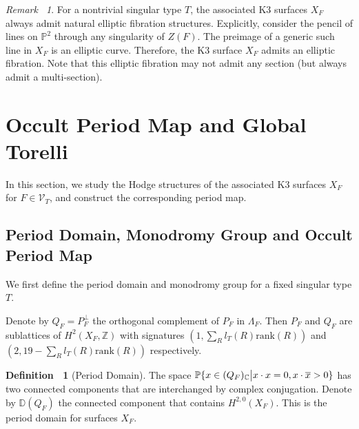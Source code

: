 \documentclass[12pt,reqno,a4paper]{amsart}
\theoremstyle{remark}
\newtheorem{rmk}[thm]{Remark~}
\theoremstyle{definition}
\newtheorem{defn}[thm]{Definition~}
\newcommand{\CC}{\mathbb{C}}
\newcommand{\ZZ}{\mathbb{Z}}
\newcommand{\PP}{\mathbb{P}}
\newcommand{\DD}{\mathbb{D}}
\newcommand{\calV}{\mathcal{V}}
\newcommand{\rank}{\mathrm{rank}}
\begin{document}
\begin{rmk}
For a nontrivial singular type $T$, the associated K3 surfaces $X_F$ always admit natural elliptic fibration structures.
Explicitly, consider the pencil of lines on $\PP^2$ through any singularity of $Z(F)$. The preimage of a generic such line in $X_F$ is an elliptic curve. Therefore, the K3 surface $X_F$ admits an elliptic fibration. Note that this elliptic fibration may not admit any section (but always admit a multi-section).
\end{rmk}


\section{Occult Period Map and Global Torelli}
\label{section: period map}
In this section, we study the Hodge structures of the associated K3 surfaces $X_F$ for $F\in\calV_T$, and construct the corresponding period map.

\subsection{Period Domain, Monodromy Group and Occult Period Map}
\label{subsection: define period map}
We first define the period domain and monodromy group for a fixed singular type $T$.


Denote by $Q_F=P_F^\perp$ the orthogonal complement of $P_F$ in $\Lambda_F$. Then $P_F$ and $Q_F$ are sublattices of $H^2(X_F,\ZZ)$ with signatures $(1,\sum_R l_{T}(R)\rank(R))$ and $(2,19-\sum_R l_{T}(R)\rank(R))$ respectively. 

\begin{defn}[Period Domain]
\label{defn: period domain}
The space $\PP\{x\in (Q_F)_\CC \big{|} x\cdot x=0, x\cdot \overline{x}>0 \}$ has two connected components that are interchanged by complex conjugation. Denote by $\DD(Q_F)$ the connected component that contains $H^{2,0}(X_F)$. This is the period domain for surfaces $X_F$.
\end{defn}
\end{document}

